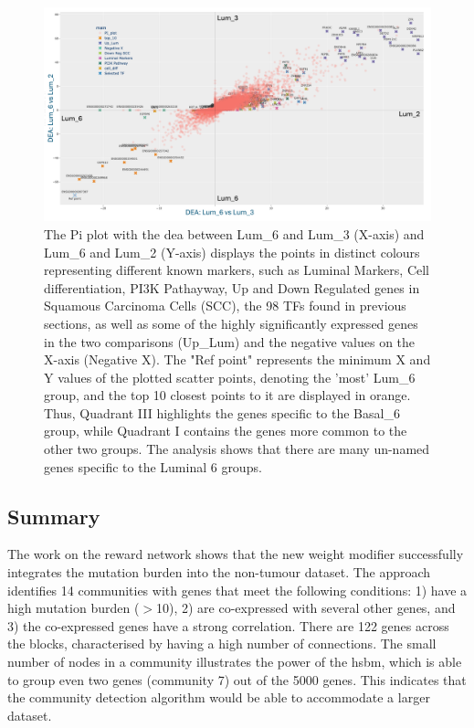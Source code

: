 \begin{figure}  
    \centering
    \includegraphics[width=1.0\textwidth,height=1.0\textheight,keepaspectratio]{Sections/Network_II/resources/reward/PI_Lum_6.png}
    \caption{The Pi plot with the \acrfull{dea} between Lum\_6 and Lum\_3 (X-axis) and Lum\_6 and Lum\_2 (Y-axis) displays the points in distinct colours representing different known markers, such as Luminal Markers, Cell differentiation, PI3K Pathayway, Up and Down Regulated genes in Squamous Carcinoma Cells (SCC), the 98 TFs found in previous sections, as well as some of the highly significantly expressed genes in the two comparisons (Up\_Lum) and the negative values on the X-axis (Negative X). The "Ref point" represents the minimum X and Y values of the plotted scatter points, denoting the 'most' Lum\_6 group, and the top 10 closest points to it are displayed in orange. Thus, Quadrant III highlights the genes specific to the Basal\_6 group, while Quadrant I contains the genes more common to the other two groups. The analysis shows that there are many un-named genes specific to the Luminal 6 groups.}
    \label{fig:N_II:pi_lum_6}
\end{figure}


\subsection{Summary}


The work on the reward network shows that the new weight modifier successfully integrates the mutation burden into the non-tumour dataset. The approach identifies 14 communities with genes that meet the following conditions: 1) have a high mutation burden ($>$10), 2) are co-expressed with several other genes, and 3) the co-expressed genes have a strong correlation. There are 122 genes across the blocks, characterised by having a high number of connections. The small number of nodes in a community illustrates the power of the \acrfull{hsbm}, which is able to group even two genes (community 7) out of the 5000 genes. This indicates that the community detection algorithm would be able to accommodate a larger dataset.

